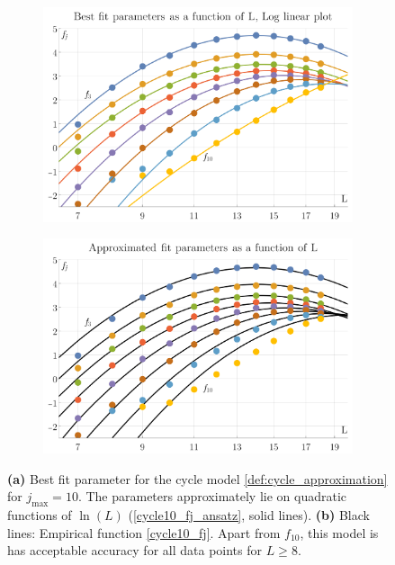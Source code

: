 \documentclass[12pt]{article}
\numberwithin{equation}{section}
\begin{document}
\begin{figure}[htb]
	\begin{subfigure}{ .49 \linewidth}
		\centering
		\includegraphics[width=\linewidth]{figures/cycle10_parameters}
		\subcaption{}
		\label{fig:cycle10_parameters}
	\end{subfigure}
	\begin{subfigure}{ .49 \linewidth}
		\centering
		\includegraphics[width=\linewidth]{figures/cycle10_parameters_approximation}
		\subcaption{}
		\label{fig:cycle10_parameters_approximation}
	\end{subfigure}
	
	\caption{\textbf{(a)} Best fit parameter for the cycle model \cref{def:cycle_approximation} for $j_\text{max}=10$. The parameters approximately lie on quadratic functions of $\ln (L)$ (\cref{cycle10_fj_ansatz}, solid lines). \textbf{(b)} Black lines: Empirical function \cref{cycle10_fj}. Apart from $f_{10}$, this model is has acceptable accuracy for all data points for $L \geq 8$. }
	
\end{figure}
\end{document}
